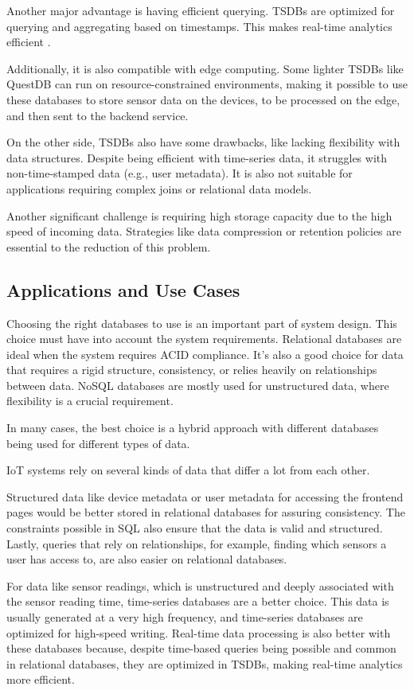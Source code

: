 Another major advantage is having efficient querying. \gls{TSDB}s are optimized
for querying and aggregating based on timestamps. This makes real-time analytics
efficient \cite{InfluxDB}.

Additionally, it is also compatible with edge computing.
Some lighter \gls{TSDB}s like QuestDB can run on resource-constrained environments,
making it possible to use these databases to store sensor data on the devices,
to be processed on the edge, and then sent to the backend service.


On the other side, \gls{TSDB}s also have some drawbacks, like lacking flexibility
with data structures.
Despite being efficient with time-series data, it struggles with non-time-stamped
data (e.g., user metadata). It is also not suitable for applications requiring
complex joins or relational data models.

Another significant challenge is requiring high storage capacity due to the
high speed of incoming data.
Strategies like data compression or retention policies
are essential to the reduction of this problem.

\subsection{Applications and Use Cases}
Choosing the right databases to use is an important part of system design. This
choice must have into account the system requirements. Relational databases are
ideal when the system requires \gls{ACID} compliance. It's also a good choice for
data that requires a rigid structure, consistency, or relies heavily on
relationships between data. \gls{NoSQL} databases are mostly used for unstructured
data, where flexibility is a crucial requirement.

In many cases, the best choice is a hybrid approach with different databases
being used for different types of data.

\gls{IoT} systems rely on several kinds of data that differ a lot from each other.

Structured data like device metadata or user metadata for accessing the
frontend pages would be better stored in relational databases for assuring
consistency. The constraints possible in \gls{SQL} also ensure that the data is valid
and structured. Lastly, queries that rely on relationships, for example, finding
which sensors a user has access to, are also easier on relational databases.

For data like sensor readings, which is unstructured and deeply associated with
the sensor reading time, time-series databases are a better choice. This data
is usually generated at a very high frequency, and time-series databases are
optimized for high-speed writing. Real-time data processing is also better with
these databases because, despite time-based queries being possible and common in
relational databases, they are optimized in \gls{TSDB}s, making
real-time analytics more efficient.

